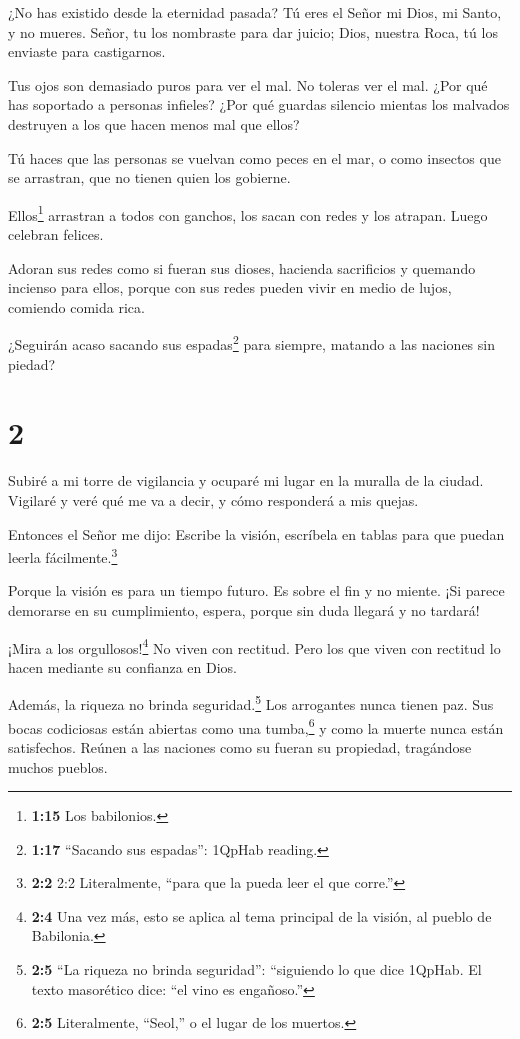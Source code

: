  ¿No has existido desde la eternidad pasada? Tú eres el
Señor mi Dios, mi Santo, y no mueres. Señor, tu los nombraste para dar
juicio; Dios, nuestra Roca, tú los enviaste para castigarnos.

 Tus ojos son demasiado puros para ver el mal. No toleras
ver el mal. ¿Por qué has soportado a personas infieles? ¿Por qué guardas
silencio mientas los malvados destruyen a los que hacen menos mal que
ellos?

 Tú haces que las personas se vuelvan como peces en el mar,
o como insectos que se arrastran, que no tienen quien los gobierne.

 Ellos\footnote{\textbf{1:15} Los babilonios.} arrastran a
todos con ganchos, los sacan con redes y los atrapan. Luego celebran
felices.

 Adoran sus redes como si fueran sus dioses, hacienda
sacrificios y quemando incienso para ellos, porque con sus redes pueden
vivir en medio de lujos, comiendo comida rica.

 ¿Seguirán acaso sacando sus espadas\footnote{\textbf{1:17}
  ``Sacando sus espadas'': 1QpHab reading.} para siempre, matando a las
naciones sin piedad?

\hypertarget{section-1}{%
\section{2}\label{section-1}}

 Subiré a mi torre de vigilancia y ocuparé mi lugar en la
muralla de la ciudad. Vigilaré y veré qué me va a decir, y cómo
responderá a mis quejas.

 Entonces el Señor me dijo: Escribe la visión, escríbela en
tablas para que puedan leerla fácilmente.\footnote{\textbf{2:2} 2:2
  Literalmente, ``para que la pueda leer el que corre.''}

 Porque la visión es para un tiempo futuro. Es sobre el fin
y no miente. ¡Si parece demorarse en su cumplimiento, espera, porque sin
duda llegará y no tardará!

 ¡Mira a los orgullosos!\footnote{\textbf{2:4} Una vez más,
  esto se aplica al tema principal de la visión, al pueblo de Babilonia.}
No viven con rectitud. Pero los que viven con rectitud lo hacen mediante
su confianza en Dios.

 Además, la riqueza no brinda seguridad.\footnote{\textbf{2:5}
  ``La riqueza no brinda seguridad'': ``siguiendo lo que dice 1QpHab. El
  texto masorético dice: ``el vino es engañoso.''} Los arrogantes nunca
tienen paz. Sus bocas codiciosas están abiertas como una
tumba,\footnote{\textbf{2:5} Literalmente, ``Seol,'' o el lugar de los
  muertos.} y como la muerte nunca están satisfechos. Reúnen a las
naciones como su fueran su propiedad, tragándose muchos pueblos.

